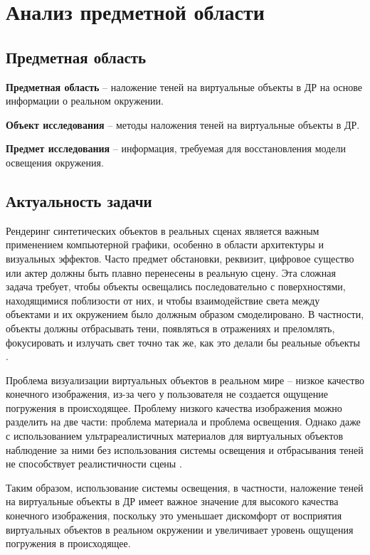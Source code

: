 \chapter{Анализ предметной области}

\section{Предметная область}

\textbf{Предметная область} -- наложение теней  на виртуальные объекты в ДР на основе информации о реальном окружении.

\textbf{Объект исследования} -- методы наложения теней  на виртуальные объекты в ДР.

\textbf{Предмет исследования} -- информация, требуемая для восстановления модели освещения окружения.

\section{Актуальность задачи}

Рендеринг синтетических объектов в реальных сценах является важным применением компьютерной графики, особенно в области архитектуры и визуальных эффектов. Часто предмет обстановки, реквизит, цифровое существо или актер должны быть плавно перенесены в реальную сцену. Эта сложная задача требует, чтобы объекты освещались последовательно с поверхностями, находящимися поблизости от них, и чтобы взаимодействие света между объектами и их окружением было должным образом смоделировано. В частности, объекты должны отбрасывать тени, появляться в отражениях и преломлять, фокусировать и излучать свет точно так же, как это делали бы реальные объекты \cite{debevec2008rendering}.

Проблема визуализации виртуальных объектов в реальном мире -- низкое качество конечного изображения, из-за чего у пользователя не создается ощущение погружения в происходящее. Проблему низкого качества изображения можно разделить на две части: проблема материала и проблема освещения. Однако даже с использованием ультрареалистичных материалов для виртуальных объектов наблюдение за ними без использования системы освещения и отбрасывания теней не способствует реалистичности сцены \cite{osti2019real}.

Таким образом, использование системы освещения, в частности, наложение теней на виртуальные объекты в ДР имеет важное значение для высокого качества конечного изображения, поскольку это уменьшает дискомфорт от восприятия виртуальных объектов в реальном окружении и увеличивает уровень ощущения погружения в происходящее.

